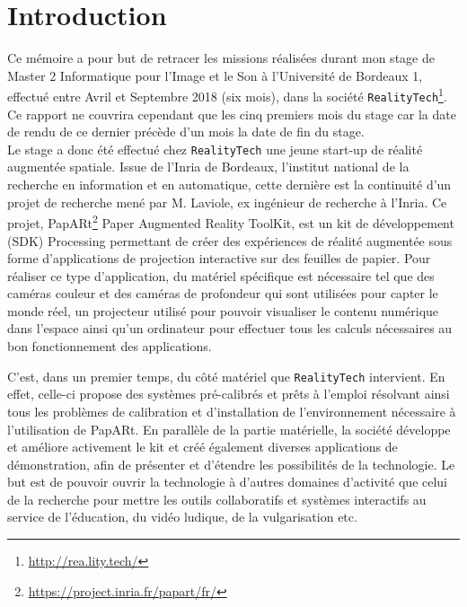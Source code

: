 \chapter{Introduction}
\label{chap:intro}

Ce mémoire a pour but de retracer les missions réalisées durant mon stage de Master 2 Informatique pour l'Image et le Son à l'Université de Bordeaux 1, effectué entre Avril et Septembre 2018 (six mois), dans la société \texttt{RealityTech}\footnote{\href{http://rea.lity.tech/}{http://rea.lity.tech/}}. Ce rapport ne couvrira cependant que les cinq premiers mois du stage car la date de rendu de ce dernier précède d'un mois la date de fin du stage.\\

Le stage a donc été effectué chez \texttt{RealityTech} une jeune start-up de réalité augmentée spatiale. Issue de l'Inria de Bordeaux, l'institut national de la recherche en information et en automatique, cette dernière est la continuité d'un projet de recherche mené par M. Laviole, ex ingénieur de recherche à l'Inria. Ce projet, PapARt\footnote{\href{https://project.inria.fr/papart/fr/}{https://project.inria.fr/papart/fr/}} Paper Augmented Reality ToolKit, est un kit de développement (SDK) Processing permettant de créer des expériences de réalité augmentée sous forme d'applications de projection interactive sur des feuilles de papier. Pour réaliser ce type d'application, du matériel spécifique est nécessaire tel que des caméras couleur et des caméras de profondeur qui sont utilisées pour capter le monde réel, un projecteur utilisé pour pouvoir visualiser le contenu numérique dans l'espace ainsi qu'un ordinateur pour effectuer tous les calculs nécessaires au bon fonctionnement des applications.

C'est, dans un premier temps, du côté matériel que \texttt{RealityTech} intervient. En effet, celle-ci propose des systèmes pré-calibrés et prêts à l'emploi résolvant ainsi tous les problèmes de calibration et d'installation de l'environnement nécessaire à l'utilisation de PapARt. En parallèle de la partie matérielle, la société développe et améliore activement le kit et créé également diverses applications de démonstration, afin de présenter et d'étendre les possibilités de la technologie. Le but est de pouvoir ouvrir la technologie à d'autres domaines d'activité que celui de la recherche pour mettre les outils collaboratifs et systèmes interactifs au service de l'éducation, du vidéo ludique, de la vulgarisation etc.

